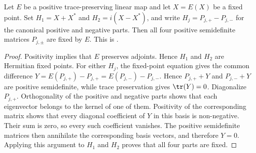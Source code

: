 \begin{theorem}\label{thm:positive_fixedpoint_parts}
    \leanok
    Let $E$ be a positive trace-preserving linear map and let $X=E(X)$ be a
    fixed point. Set $H_1=X+X^*$ and $H_2=i(X-X^*)$, and write
    $H_j=P_{j,+}-P_{j,-}$ for the canonical positive and negative parts.
    Then all four positive semidefinite matrices $P_{j,\pm}$ are fixed by
    $E$. This is \cite[Proposition~6.8]{Wolf2012Quantum}.
\end{theorem}

\begin{proof}
    \leanok
    Positivity implies that $E$ preserves adjoints. Hence $H_1$ and $H_2$
    are Hermitian fixed points. For either $H_j$, the fixed-point equation
    gives the common difference
    $Y=E(P_{j,+})-P_{j,+}=E(P_{j,-})-P_{j,-}$. Hence $P_{j,+}+Y$ and
    $P_{j,-}+Y$ are positive semidefinite, while trace preservation gives
    $\tr(Y)=0$. Diagonalize $P_{j,+}$. Orthogonality of the positive and
    negative parts shows that each eigenvector belongs to the kernel of one
    of them. Positivity of the corresponding matrix shows that every diagonal
    coefficient of $Y$ in this basis is non-negative. Their sum is zero, so
    every such coefficient vanishes. The positive semidefinite matrices then
    annihilate the corresponding basis vectors, and therefore $Y=0$.
    Applying this argument to $H_1$ and $H_2$ proves that all four parts are
    fixed.
\end{proof}

